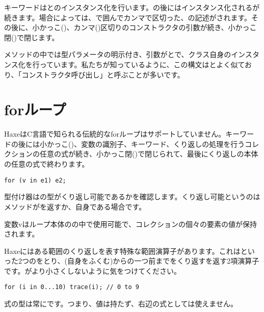 キーワードはとのインスタンス化を行います。の後にはインスタンス化されるが続きます。場合によっては、\expr{<>}で囲んでカンマ\expr{,}で区切った、の記述がされます。その後に、小かっこ(\expr{(})、カンマ(\expr{,})区切りのコンストラクタの引数が続き、小かっこ閉(\expr{)})で閉じます。


メソッドの中では型パラメータの明示付き、引数がとで、クラス自身のインスタンス化を行っています。私たちが知っているように、この構文はとよく似ており、「コンストラクタ呼び出し」と呼ぶことが多いです。

\section{forループ}
\label{expression-for}

HaxeはC言語で知られる伝統的なforループはサポートしていません。キーワードの後には小かっこ(\expr{(})、変数の識別子、キーワード、くり返しの処理を行うコレクションの任意の式が続き、小かっこ閉(\expr{)})で閉じられて、最後にくり返しの本体の任意の式で終わります。

\begin{lstlisting}
for (v in e1) e2;
\end{lstlisting}

型付け器はの型がくり返し可能であるかを確認します。くり返し可能というのはメソッドがを返すか、自身である場合です。

変数vはループ本体のの中で使用可能で、コレクションの個々の要素の値が保持されます。

Haxeにはある範囲のくり返しを表す特殊な範囲演算子があります。これはといった2つのをとり、(自身をふくむ)からの一つ前までをくり返すを返す2項演算子です。がより小さくしないように気をつけてください。

\begin{lstlisting}
for (i in 0...10) trace(i); // 0 to 9
\end{lstlisting}

式の型は常にです。つまり、値は持たず、右辺の式としては使えません。

